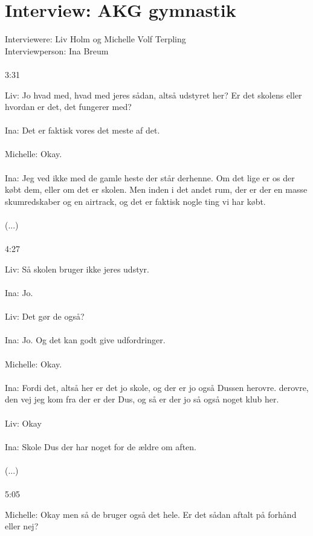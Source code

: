 \chapter{Interview: AKG gymnastik}\label{ch:appDlabel}
Interviewere: Liv Holm og Michelle Volf Terpling\\
Interviewperson: Ina Breum
\\\\
3:31
\par
Liv: Jo hvad med, hvad med jeres sådan, altså udstyret her? Er det skolens eller hvordan er det, det fungerer med?
\\\\
Ina: Det er faktisk vores det meste af det. 
\\\\
Michelle: Okay.
\\\\
Ina: Jeg ved ikke med de gamle heste der står derhenne. Om det lige er os der købt dem, eller om det er skolen. Men inden i det andet rum, der er der en masse skumredskaber og en airtrack, og det er faktisk nogle ting vi har købt. 
\\\\
(...)
\\\\
4:27
\par
Liv: Så skolen bruger ikke jeres udstyr.
\\\\
Ina: Jo. 
\\\\
Liv: Det gør de også?
\\\\
Ina: Jo. Og det kan godt give udfordringer. 
\\\\
Michelle: Okay.
\\\\
Ina: Fordi det, altså her er det jo skole, og der er jo også Dussen herovre. derovre, den vej jeg kom fra der er der Dus, og så er der jo så også noget klub her. 
\\\\
Liv: Okay
\\\\
Ina: Skole Dus der har noget for de ældre om aften. 
\\\\
(...)
\\\\
5:05
\par
Michelle: Okay men så de bruger også det hele. Er det sådan aftalt på forhånd eller nej?

